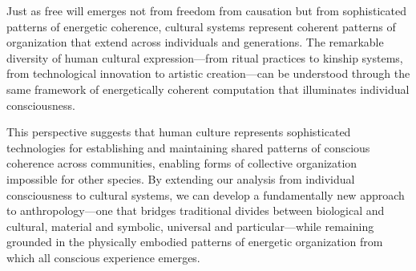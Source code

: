 Just as free will emerges not from freedom from causation but from sophisticated patterns of energetic coherence, cultural systems represent coherent patterns of organization that extend across individuals and generations. The remarkable diversity of human cultural expression—from ritual practices to kinship systems, from technological innovation to artistic creation—can be understood through the same framework of energetically coherent computation that illuminates individual consciousness. 

This perspective suggests that human culture represents sophisticated technologies for establishing and maintaining shared patterns of conscious coherence across communities, enabling forms of collective organization impossible for other species. By extending our analysis from individual consciousness to cultural systems, we can develop a fundamentally new approach to anthropology—one that bridges traditional divides between biological and cultural, material and symbolic, universal and particular—while remaining grounded in the physically embodied patterns of energetic organization from which all conscious experience emerges.
